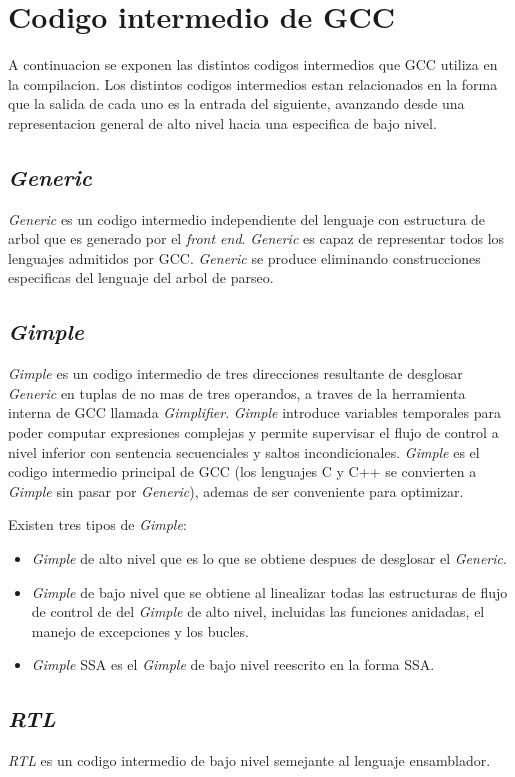 \chapter{Codigo intermedio de GCC}

A continuacion se exponen las distintos codigos intermedios que GCC utiliza en la compilacion. 
Los distintos codigos intermedios estan relacionados en la forma que la salida 
de cada uno es la entrada del siguiente, avanzando desde una representacion general de alto nivel 
hacia una especifica de bajo nivel. 

\section{\emph{Generic}}

\emph{Generic} es un codigo intermedio independiente del lenguaje con estructura de arbol 
que es generado por el \emph{front end}. \emph{Generic} es capaz de representar todos los 
lenguajes admitidos por GCC. \emph{Generic} se produce eliminando construcciones especificas 
del lenguaje del arbol de parseo. 

\section{\emph{Gimple}}

\emph{Gimple} es un codigo intermedio de tres direcciones resultante de desglosar \emph{Generic} en tuplas 
de no mas de tres operandos, a traves de la herramienta interna de GCC llamada \emph{Gimplifier}. 
\emph{Gimple} introduce variables temporales para poder computar expresiones complejas y permite 
supervisar el flujo de control a nivel inferior con sentencia secuenciales y saltos incondicionales. 
\emph{Gimple} es el codigo intermedio principal de GCC (los lenguajes C y C++ se convierten a \emph{Gimple} 
sin pasar por \emph{Generic}), ademas de ser conveniente para optimizar. 

Existen tres tipos de \emph{Gimple}:

\begin{itemize}
    \item \emph{Gimple} de alto nivel que es lo que se obtiene despues de desglosar el \emph{Generic}.
    \item \emph{Gimple} de bajo nivel que se obtiene al linealizar todas las estructuras de flujo de control de 
            del \emph{Gimple} de alto nivel, incluidas las funciones anidadas, el manejo de excepciones y los bucles.
    \item \emph{Gimple} SSA es el \emph{Gimple} de bajo nivel reescrito en la forma SSA.
\end{itemize}

\section{\emph{RTL}}

\emph{RTL} es un codigo intermedio de bajo nivel semejante al lenguaje ensamblador.
